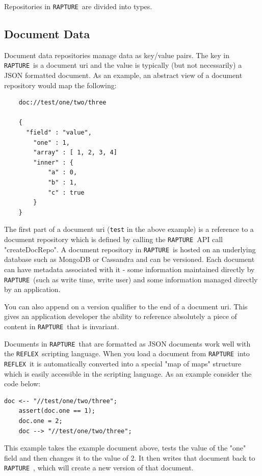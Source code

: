 \documentclass[12pt,twoside,a4paper]{book}
\newcommand{\Rapture}{\Verb+RAPTURE+~}
\newcommand{\Reflex}{\Verb+REFLEX+~}
\begin{document}
Repositories in \Rapture are divided into types.

\subsection{Document Data}
Document data repositories manage data as key/value pairs. The key in \Rapture is a document uri and the value
is typically (but not necessarily) a JSON formatted document. As an example, an abstract view of a document repository would map the following:

\begin{Verbatim}
	doc://test/one/two/three

	{
	  "field" : "value",
		"one" : 1,
		"array" : [ 1, 2, 3, 4]
		"inner" : {
			"a" : 0,
			"b" : 1,
			"c" : true
		}
	}
\end{Verbatim}

The first part of a document uri (\Verb+test+ in the above example) is a reference to a
document repository which is defined by calling the \Rapture API call "createDocRepo". A
document repository in \Rapture is hosted on an underlying database such as MongoDB or Cassandra
and can be versioned. Each document can have metadata associated with it - some information maintained
directly by \Rapture (such as write time, write user) and some information managed directly by
an application.

You can also append on a version qualifier to the end of a document uri. This gives an application
developer the ability to reference absolutely a piece of content in \Rapture that is invariant.

Documents in \Rapture that are formatted as JSON documents work well with the \Reflex scripting language. When
you load a document from \Rapture into \Reflex it is automatically converted into a special "map of maps" structure
which is easily accessible in the scripting language. As an example consider the code below:

\begin{lstlisting}[caption={Reflex document example}, language=reflex]
  doc <-- "//test/one/two/three";
	assert(doc.one == 1);
	doc.one = 2;
	doc --> "//test/one/two/three";
\end{lstlisting}

This example takes the example document above, tests the value of the "one" field and then
changes it to the value of 2. It then writes that document back to \Rapture, which will create a new
version of that document.
\end{document}
